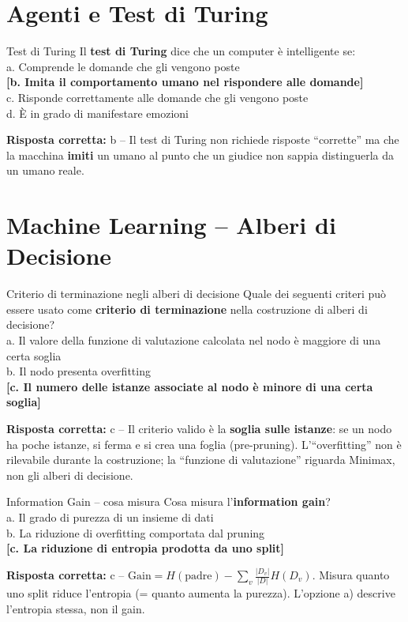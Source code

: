 \documentclass[12pt,a4paper]{article}
\newcommand{\corr}[1]{\textcolor{green!55!black}{\textbf{[#1]}}}
\newcommand{\risp}[1]{\begin{abox}\textbf{Risposta corretta: }#1\end{abox}}
\begin{document}
\section{Agenti e Test di Turing}

\begin{qbox}{Test di Turing}
Il \textbf{test di Turing} dice che un computer è intelligente se:
\\[4pt]
a. Comprende le domande che gli vengono poste\\
\corr{b. Imita il comportamento umano nel rispondere alle domande}\\
c. Risponde correttamente alle domande che gli vengono poste\\
d. È in grado di manifestare emozioni
\end{qbox}
\risp{b -- Il test di Turing non richiede risposte ``corrette'' ma che la macchina \textbf{imiti} un umano al punto che un giudice non sappia distinguerla da un umano reale.}

\section{Machine Learning -- Alberi di Decisione}

\begin{qbox}{Criterio di terminazione negli alberi di decisione}
Quale dei seguenti criteri può essere usato come \textbf{criterio di terminazione} nella
costruzione di alberi di decisione?
\\[4pt]
a. Il valore della funzione di valutazione calcolata nel nodo è maggiore di una certa soglia\\
b. Il nodo presenta overfitting\\
\corr{c. Il numero delle istanze associate al nodo è minore di una certa soglia}
\end{qbox}
\risp{c -- Il criterio valido è la \textbf{soglia sulle istanze}: se un nodo ha poche istanze, si ferma e si crea una foglia (pre-pruning). L'``overfitting'' non è rilevabile durante la costruzione; la ``funzione di valutazione'' riguarda Minimax, non gli alberi di decisione.}

\bigskip
\begin{qbox}{Information Gain -- cosa misura}
Cosa misura l'\textbf{information gain}?
\\[4pt]
a. Il grado di purezza di un insieme di dati\\
b. La riduzione di overfitting comportata dal pruning\\
\corr{c. La riduzione di entropia prodotta da uno split}
\end{qbox}
\risp{c -- $\text{Gain} = H(\text{padre}) - \sum_v \frac{|D_v|}{|D|} H(D_v)$. Misura quanto uno split riduce l'entropia (= quanto aumenta la purezza). L'opzione a) descrive l'entropia stessa, non il gain.}
\end{document}
